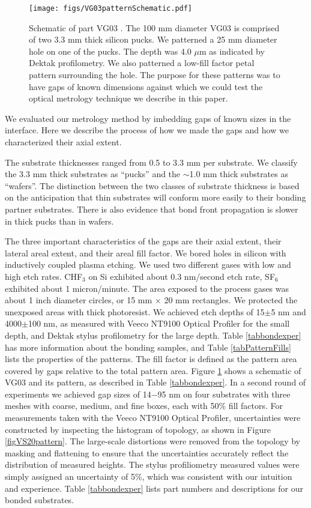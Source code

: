 \documentclass[osajnl,preprint,showpacs,superscriptaddress,12pt]{revtex4-1} %
\begin{document}
\begin{figure}[htbp]
\centerline{\texttt{[image: figs/VG03patternSchematic.pdf]}}
\caption{Schematic of part VG03 \label{figVG03pattern}.  The 100 mm diameter VG03 is comprised of two 3.3 mm thick silicon pucks.  We patterned a 25 mm diameter hole on one of the pucks.  The depth was 4.0 $\mu$m as indicated by Dektak profilometry.  We also patterned a low-fill factor petal pattern surrounding the hole.  The purpose for these patterns was to have gaps of known dimensions against which we could test the optical metrology technique we describe in this paper.}
\end{figure}

We evaluated our metrology method by imbedding gaps of known sizes in the interface.  Here we describe the process of how we made the gaps and how we characterized their axial extent.  

The substrate thicknesses ranged from 0.5 to 3.3 mm per substrate.  We classify the 3.3 mm thick substrates as ``pucks'' and the $\sim$1.0 mm thick substrates as ``wafers''.  The distinction between the two classes of substrate thickness is based on the anticipation that thin substrates will conform more easily to their bonding partner substrates.  There is also evidence that bond front propagation is slower in thick pucks \cite{2007ApOpt..46.6793H} than in wafers.  

The three important characteristics of the gaps are their axial extent, their lateral areal extent, and their areal fill factor.  We bored holes in silicon with inductively coupled plasma etching.  We used two different gases with low and high etch rates.  CHF$_3$ on Si exhibited about 0.3 nm/second etch rate, SF$_6$ exhibited about 1 micron/minute.  The area exposed to the process gases was about 1 inch diameter circles, or 15 mm $\times$ 20 mm rectangles.  We protected the unexposed areas with thick photoresist.  We achieved etch depths of 15$\pm$5 nm and 4000$\pm$100 nm, as measured with Veeco NT9100 Optical Profiler for the small depth, and Dektak stylus profilometry for the large depth.  Table \ref{tabbondexper} has more information about the bonding samples, and Table \ref{tabPatternFills} lists the properties of the patterns.  The fill factor is defined as the pattern area covered by gaps relative to the total pattern area.  Figure \ref{figVG03pattern} shows a schematic of VG03 and its pattern, as described in Table \ref{tabbondexper}.  In a second round of experiments we achieved gap sizes of 14$-$95 nm on four substrates with three meshes with coarse, medium, and fine boxes, each with 50\% fill factors.  For measurements taken with the Veeco NT9100 Optical Profiler, uncertainties were constructed by inspecting the histogram of topology, as shown in Figure \ref{figVS20pattern}.  The large-scale distortions were removed from the topology by masking and flattening to ensure that the uncertainties accurately reflect the distribution of measured heights.  The stylus profiliometry measured values were simply assigned an uncertainty of 5\%, which was consistent with our intuition and experience.  Table \ref{tabbondexper} lists part numbers and descriptions for our bonded substrates.
\end{document}
